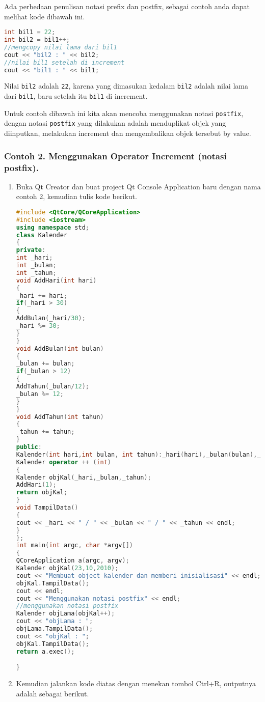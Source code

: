 Ada perbedaan penulisan notasi prefix dan postfix, sebagai contoh anda
dapat melihat kode dibawah ini.

\begin{lstlisting}[language=c++]
int bil1 = 22;
int bil2 = bil1++;
//mengcopy nilai lama dari bil1
cout << "bil2 : " << bil2;
//nilai bil1 setelah di increment
cout << "bil1 : " << bil1;
\end{lstlisting}

Nilai \texttt{bil2} adalah \texttt{22}, karena yang dimasukan kedalam
\texttt{bil2} adalah nilai lama dari \texttt{bil1}, baru setelah itu
\texttt{bil1} di increment.

Untuk contoh dibawah ini kita akan mencoba menggunakan notasi
\texttt{postfix}, dengan notasi \texttt{postfix} yang dilakukan adalah
menduplikat objek yang diinputkan, melakukan increment dan mengembalikan
objek tersebut by value.

\subsubsection*{Contoh 2. Menggunakan Operator Increment (notasi postfix).}

\begin{enumerate}
\def\labelenumi{\arabic{enumi}.}
\item
  Buka Qt Creator dan buat project Qt Console Application baru dengan
  nama contoh 2, kemudian tulis kode berikut.

\begin{lstlisting}[language=c++]
#include <QtCore/QCoreApplication>
#include <iostream>
using namespace std;
class Kalender
{
private:
int _hari;
int _bulan;
int _tahun;
void AddHari(int hari)
{
_hari += hari;
if(_hari > 30)
{
AddBulan(_hari/30);
_hari %= 30;
}
}
void AddBulan(int bulan)
{
_bulan += bulan;
if(_bulan > 12)
{
AddTahun(_bulan/12);
_bulan %= 12;
}
}
void AddTahun(int tahun)
{
_tahun += tahun;
}
public:
Kalender(int hari,int bulan, int tahun):_hari(hari),_bulan(bulan),_tahun(tahun){ }
Kalender operator ++ (int)
{
Kalender objKal(_hari,_bulan,_tahun);
AddHari(1);
return objKal;
}
void TampilData()
{
cout << _hari << " / " << _bulan << " / " << _tahun << endl;
}
};
int main(int argc, char *argv[])
{
QCoreApplication a(argc, argv);
Kalender objKal(23,10,2010);
cout << "Membuat object kalender dan memberi inisialisasi" << endl;
objKal.TampilData();
cout << endl;
cout << "Menggunakan notasi postfix" << endl;
//menggunakan notasi postfix
Kalender objLama(objKal++);
cout << "objLama : ";
objLama.TampilData();
cout << "objKal : ";
objKal.TampilData();
return a.exec();

}
\end{lstlisting}
\item
  Kemudian jalankan kode diatas dengan menekan tombol Ctrl+R, outputnya
  adalah sebagai berikut.
\end{enumerate}

